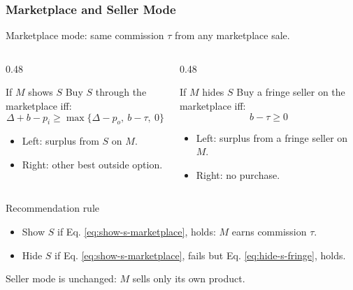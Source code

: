 \begin{frame}
  \frametitle{Marketplace and Seller Mode}
  \footnotesize
  Marketplace mode: same commission $\tau$ from any marketplace sale.

  \begin{columns}[T,onlytextwidth]
    \begin{column}{0.48\textwidth}
      \begin{block}{If $M$ shows $S$}
        Buy $S$ through the marketplace iff:
        \begin{equation}
          \Delta+b-p_i\geq \max\{\Delta-p_o,\ b-\tau,\ 0\}
          \label{eq:show-s-marketplace}
        \end{equation}
        \begin{itemize}
          \item Left: surplus from $S$ on $M$.
          \item Right: other best outside option.
        \end{itemize}
      \end{block}
    \end{column}

    \begin{column}{0.48\textwidth}
      \begin{block}{If $M$ hides $S$}
        Buy a fringe seller on the marketplace iff:
        \begin{equation}
          b-\tau\geq 0
          \label{eq:hide-s-fringe}
        \end{equation}
        \begin{itemize}
          \item Left: surplus from a fringe seller on $M$.
          \item Right: no purchase.
        \end{itemize}
      \end{block}
    \end{column}
  \end{columns}

  \begin{block}{Recommendation rule}
    \begin{itemize}
      \item Show $S$ if Eq. \eqref{eq:show-s-marketplace}, holds: $M$ earns commission $\tau$.
      \item Hide $S$ if Eq. \eqref{eq:show-s-marketplace}, fails but Eq. \eqref{eq:hide-s-fringe}, holds.
    \end{itemize}
  \end{block}

  Seller mode is unchanged: $M$ sells only its own product.
\end{frame}



